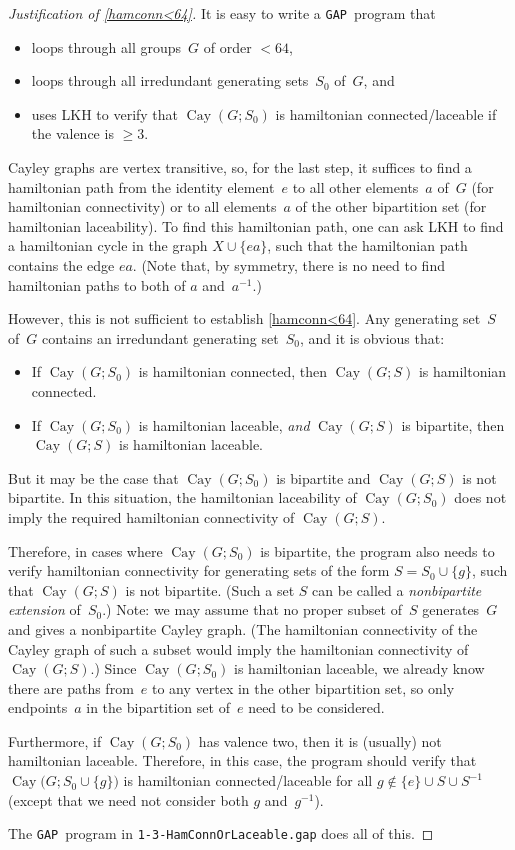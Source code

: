 \documentclass[]{amcjoucc}
\theoremstyle{plain}
\theoremstyle{definition}
\theoremstyle{definition}
\DeclareMathOperator{\Cay}{Cay}
\newcommand{\GAP}{\filename{GAP}}
\newcommand{\filename}[1]{\texttt{#1}}
\newcommand{\function}[1]{\textsf{#1}}
\begin{document}
\begin{proof}[Justification of \cref{hamconn<64}]
It is easy to write a \GAP\ program that
	\begin{itemize}
	\item loops through all groups~$G$ of order $< 64$,
	\item loops through all irredundant generating sets~$S_0$ of~$G$,
	and
	\item uses \function{LKH} to verify that $\Cay(G;S_0)$ is hamiltonian connected/laceable if the valence is $\ge 3$.
	\end{itemize}
Cayley graphs are vertex transitive, so, for the last step, it suffices to find a hamiltonian path from the identity element~$e$ to all other elements~$a$ of~$G$ (for hamiltonian connectivity) or to all elements~$a$ of the other bipartition set (for hamiltonian laceability). To find this hamiltonian path, one can ask \function{LKH} to find a hamiltonian cycle in the graph $X \cup \{ea\}$, such that the hamiltonian path contains the edge $ea$. (Note that, by symmetry, there is no need to find hamiltonian paths to both of $a$ and~$a^{-1}$.)

However, this is not sufficient to establish \cref{hamconn<64}.
Any generating set~$S$ of~$G$ contains an irredundant generating set~$S_0$, and it is obvious that:
	\begin{itemize}
	\item If $\Cay(G;S_0)$ is hamiltonian connected, then $\Cay(G;S)$ is hamiltonian connected. 
	\item If $\Cay(G;S_0)$ is hamiltonian laceable, \emph{and} $\Cay(G;S)$ is bipartite, then $\Cay(G;S)$ is hamiltonian laceable. 
	\end{itemize}
But it may be the case that $\Cay(G;S_0)$ is bipartite and $\Cay(G;S)$ is not bipartite. In this situation, the hamiltonian laceability of $\Cay(G;S_0)$ does not imply the required hamiltonian connectivity of $\Cay(G;S)$.

Therefore, in cases where $\Cay(G;S_0)$ is bipartite, the program also needs to verify hamiltonian connectivity for generating sets of the form $S = S_0 \cup \{g\}$, such that $\Cay(G;S)$ is not bipartite. (Such a set $S$ can be called a \emph{nonbipartite extension} of~$S_0$.) Note: we may assume that no proper subset of~$S$ generates~$G$ and gives a nonbipartite Cayley graph. (The hamiltonian connectivity of the Cayley graph of such a subset would imply the hamiltonian connectivity of $\Cay(G;S)$.) Since $\Cay(G;S_0)$ is hamiltonian laceable, we already know there are paths from~$e$ to any vertex in the other bipartition set, so only endpoints~$a$ in the bipartition set of~$e$ need to be considered.

Furthermore, if $\Cay(G;S_0)$ has valence two, then it is (usually) not hamiltonian laceable. Therefore, in this case, the program should verify that $\Cay \bigl( G;  S_0 \cup \{g\} \bigr)$ is hamiltonian connected/laceable for all $g \notin \{e\} \cup S \cup S^{-1}$ (except that we need not consider both $g$ and~$g^{-1}$).

The \GAP\ program in \filename{1-3-HamConnOrLaceable.gap} does all of this.
\end{proof}
\end{document}
